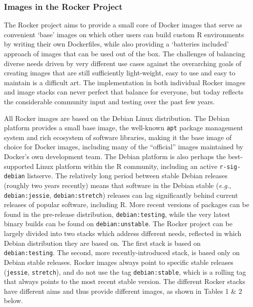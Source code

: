 \subsubsection{Images in the Rocker
Project}\label{images-in-the-rocker-project}

The Rocker project aims to provide a small core of Docker images that
serve as convenient `base' images on which other users can build custom
R environments by writing their own Dockerfiles, while also providing a
`batteries included' approach of images that can be used out of the box.
The challenges of balancing diverse needs driven by very different use
cases against the overarching goals of creating images that are still
sufficiently light-weight, easy to use and easy to maintain is a
difficult art. The implementation in both individual Rocker images and
image stacks can never perfect that balance for everyone, but today
reflects the considerable community input and testing over the past few
years.

All Rocker images are based on the Debian Linux distribution. The Debian
platform provides a small base image, the well-known \texttt{apt}
package management system and rich ecosystem of software libraries,
making it the base image of choice for Docker images, including many of
the ``official'' images maintained by Docker's own development team. The
Debian platform is also perhaps the best-supported Linux platform within
the R community, including an active \texttt{r-sig-debian} listserve.
The relatively long period between stable Debian releases (roughly two
years recently) means that software in the Debian stable (\emph{e.g.},
\texttt{debian:jessie}, \texttt{debian:stretch}) releases can lag
significantly behind current releases of popular software, including R.
More recent versions of packages can be found in the pre-release
distribution, \texttt{debian:testing}, while the very latest binary
builds can be found on \texttt{debian:unstable}. The Rocker project can
be largely divided into two stacks which address different needs,
reflected in which Debian distribution they are based on. The first
stack is based on \texttt{debian:testing}. The second, more
recently-introduced stack, is based only on Debian stable releases.
Rocker images always point to specific stable releases (\texttt{jessie},
\texttt{stretch}), and do not use the tag \texttt{debian:stable}, which
is a rolling tag that always points to the most recent stable version.
The different Rocker stacks have different aims and thus provide
different images, as shown in Tables 1 \& 2 below.

